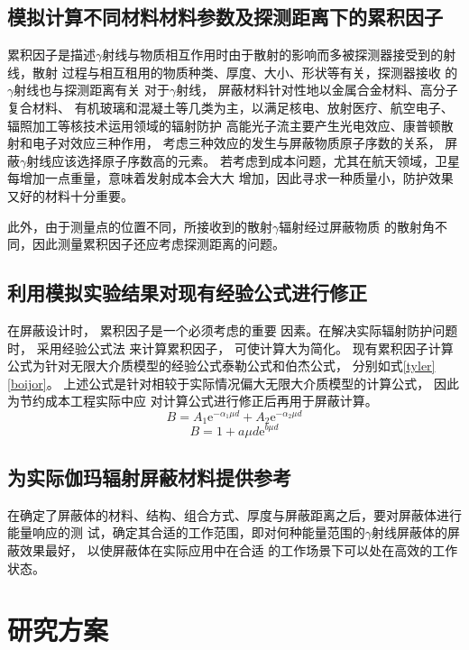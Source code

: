 \subsection{模拟计算不同材料材料参数及探测距离下的累积因子}
累积因子是描述$\gamma$射线与物质相互作用时由于散射的影响而多被探测器接受到的射线，散射
过程与相互租用的物质种类、厚度、大小、形状等有关，探测器接收
的$\gamma$射线也与探测距离有关
对于$\gamma$射线，
屏蔽材料针对性地以金属合金材料、高分子复合材料、
有机玻璃和混凝土等几类为主，以满足核电、放射医疗、航空电子、
辐照加工等核技术运用领域的辐射防护
高能光子流主要产生光电效应、康普顿散射和电子对效应三种作用，
考虑三种效应的发生与屏蔽物质原子序数的关系，
屏蔽$\gamma$射线应该选择原子序数高的元素。
若考虑到成本问题，尤其在航天领域，卫星每增加一点重量，意味着发射成本会大大
增加，因此寻求一种质量小，防护效果又好的材料十分重要。

此外，由于测量点的位置不同，所接收到的散射$\gamma$辐射经过屏蔽物质
的散射角不同，因此测量累积因子还应考虑探测距离的问题。
\subsection{利用模拟实验结果对现有经验公式进行修正}
在屏蔽设计时， 累积因子是一个必须考虑的重要
因素。在解决实际辐射防护问题时， 采用经验公式法
来计算累积因子， 可使计算大为简化。
现有累积因子计算公式为针对无限大介质模型的经验公式泰勒公式和伯杰公式，
分别如式\eqref{tyler}\eqref{boijor}。
上述公式是针对相较于实际情况偏大无限大介质模型的计算公式，
因此为节约成本工程实际中应
对计算公式进行修正后再用于屏蔽计算。
\begin{equation}
    B=A_{1} \mathrm{e}^{-\alpha_{1} \mu d}+A_{2} \mathrm{e}^{-\alpha_{2} \mu d} \label{tyler}
\end{equation}
\begin{equation}
    B=1+a \mu d \mathrm{e}^{b \mu d} \label{boijor}
\end{equation}
\subsection{为实际伽玛辐射屏蔽材料提供参考}
在确定了屏蔽体的材料、结构、组合方式、厚度与屏蔽距离之后，要对屏蔽体进行能量响应的测
试，确定其合适的工作范围，即对何种能量范围的$\gamma$射线屏蔽体的屏蔽效果最好，
以使屏蔽体在实际应用中在合适
的工作场景下可以处在高效的工作状态。
\section{研究方案}
